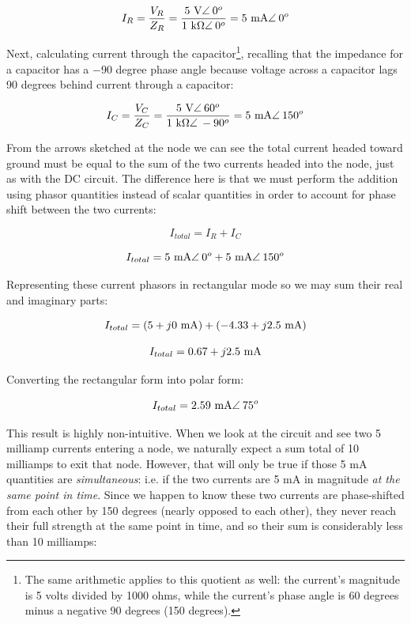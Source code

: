 $$I_R = {V_R \over Z_R} = {5 \hbox{ V} \angle \> 0^{o} \over 1 \hbox{ k}\Omega \angle \> 0^{o}} = 5 \hbox{ mA} \angle \> 0^{o}$$

\vskip 10pt

Next, calculating current through the capacitor\footnote{The same arithmetic applies to this quotient as well: the current's magnitude is 5 volts divided by 1000 ohms, while the current's phase angle is 60 degrees minus a negative 90 degrees (150 degrees).}, recalling that the impedance for a capacitor has a $-$90 degree phase angle because voltage across a capacitor lags 90 degrees behind current through a capacitor:

$$I_C = {V_C \over Z_C} = {5 \hbox{ V} \angle \> 60^{o} \over 1 \hbox{ k}\Omega \angle \> -90^{o}} = 5 \hbox{ mA} \angle \> 150^{o}$$

\vskip 10pt

\filbreak

From the arrows sketched at the node we can see the total current headed toward ground must be equal to the sum of the two currents headed into the node, just as with the DC circuit.  The difference here is that we must perform the addition using phasor quantities instead of scalar quantities in order to account for phase shift between the two currents:

$$I_{total} = I_R + I_C$$

$$I_{total} = 5 \hbox{ mA} \angle \> 0^{o} + 5 \hbox{ mA} \angle \> 150^{o}$$

Representing these current phasors in rectangular mode so we may sum their real and imaginary parts:

$$I_{total} = (5 + j 0 \hbox{ mA}) + (-4.33 + j 2.5 \hbox{ mA})$$

$$I_{total} = 0.67 + j 2.5 \hbox{ mA}$$

\vskip 10pt

Converting the rectangular form into polar form:

$$I_{total} = 2.59 \hbox{ mA} \angle \> 75^{o}$$

\vskip 10pt

This result is highly non-intuitive.  When we look at the circuit and see two 5 milliamp currents entering a node, we naturally expect a sum total of 10 milliamps to exit that node.  However, that will only be true if those 5 mA quantities are \textit{simultaneous}: i.e. if the two currents are 5 mA in magnitude \textit{at the same point in time}.  Since we happen to know these two currents are phase-shifted from each other by 150 degrees (nearly opposed to each other), they never reach their full strength at the same point in time, and so their sum is considerably less than 10 milliamps:

